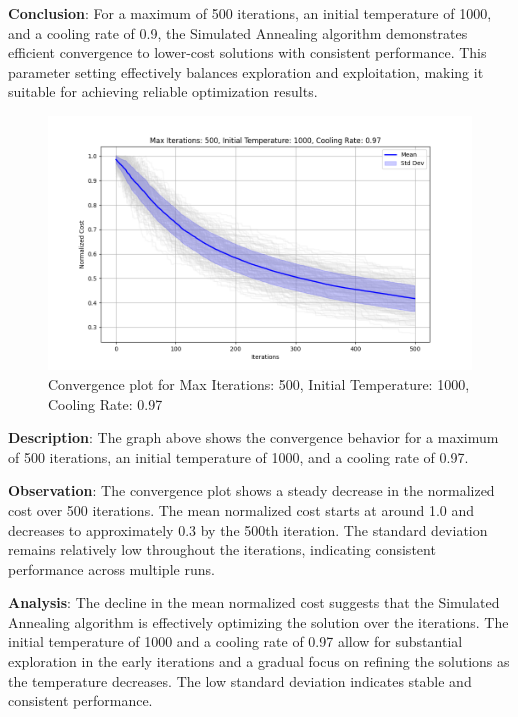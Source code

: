 \documentclass[
]{article}
\begin{document}
    \textbf{Conclusion}: For a maximum of 500 iterations, an initial temperature of 1000, and a cooling rate of 0.9, the Simulated Annealing algorithm demonstrates efficient convergence to lower-cost solutions with consistent performance. This parameter setting effectively balances exploration and exploitation, making it suitable for achieving reliable optimization results.

    \begin{figure}[H]
        \centering
        \includegraphics[width=\textwidth]{simulated_annealing/max_iter_500_init_temp_1000_cooling_rate_0.97}
        \caption{Convergence plot for Max Iterations: 500, Initial Temperature: 1000, Cooling Rate: 0.97}
        \label{fig:sa_500_1000_0.97}
    \end{figure}

    \textbf{Description}: The graph above shows the convergence behavior for a maximum of 500 iterations, an initial temperature of 1000, and a cooling rate of 0.97.

    \textbf{Observation}: The convergence plot shows a steady decrease in the normalized cost over 500 iterations. The mean normalized cost starts at around 1.0 and decreases to approximately 0.3 by the 500th iteration. The standard deviation remains relatively low throughout the iterations, indicating consistent performance across multiple runs.

    \textbf{Analysis}: The decline in the mean normalized cost suggests that the Simulated Annealing algorithm is effectively optimizing the solution over the iterations. The initial temperature of 1000 and a cooling rate of 0.97 allow for substantial exploration in the early iterations and a gradual focus on refining the solutions as the temperature decreases. The low standard deviation indicates stable and consistent performance.
\end{document}
